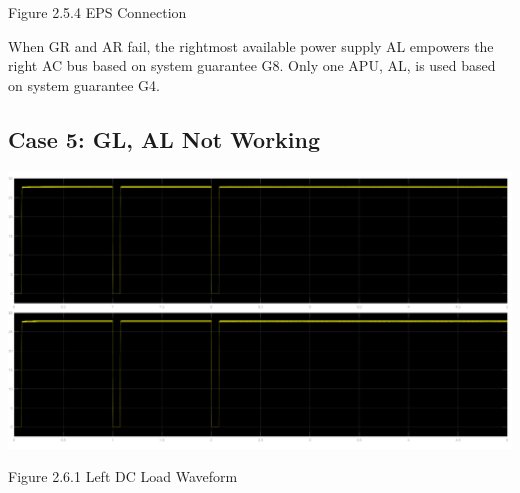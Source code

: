 \documentclass{mcmthesis}
\begin{document}
\begin{center}
\small{Figure 2.5.4 EPS Connection}
\end{center}
When GR and AR fail,  the rightmost available power supply AL empowers the right AC bus based on system guarantee G8. Only one APU, AL, is used based on system guarantee G4.
\pagebreak

\subsection{Case 5: GL, AL Not Working}
\begin{center}
\includegraphics[trim= 0 0.28\imageheight{} 0 0, clip, width = 0.165\imageheight{}]{gl_al_load1.png}
\end{center}
\begin{center}
\small{Figure 2.6.1 Left DC Load Waveform}
\end{center}
\end{document}

